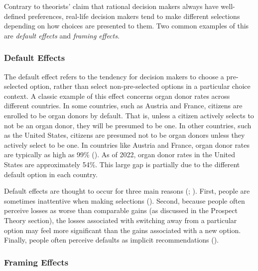 \documentclass[
]{krantz}
\begin{document}
Contrary to theorists' claim that rational decision makers always have well-defined preferences, real-life decision makers tend to make different selections depending on how choices are presented to them. Two common examples of this are \emph{default effects} and \emph{framing effects}.

\subsubsection*{Default Effects}\label{default-effects}


The default effect refers to the tendency for decision makers to choose a pre-selected option, rather than select non-pre-selected options in a particular choice context. A classic example of this effect concerns organ donor rates across different countries. In some countries, such as Austria and France, citizens are enrolled to be organ donors by default. That is, unless a citizen actively selects to not be an organ donor, they will be presumed to be one. In other countries, such as the United States, citizens are presumed not to be organ donors unless they actively select to be one. In countries like Austria and France, organ donor rates are typically as high as 99\% (). As of 2022, organ donor rates in the United States are approximately 54\%. This large gap is partially due to the different default option in each country.

Default effects are thought to occur for three main reasons (; ). First, people are sometimes inattentive when making selections (). Second, because people often perceive losses as worse than comparable gains (as discussed in the Prospect Theory section), the losses associated with switching away from a particular option may feel more significant than the gains associated with a new option. Finally, people often perceive defaults as implicit recommendations ().

\subsubsection*{Framing Effects}\label{framing-effects}
\end{document}
